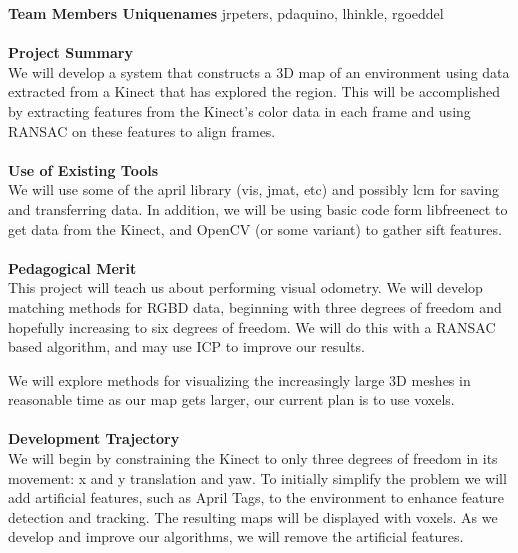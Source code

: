 \documentclass[12pt]{article}
\begin{document}
{\bf Team Members Uniquenames}
jrpeters, pdaquino, lhinkle, rgoeddel
\\ \\
{\bf Project Summary }\\
We will develop a system that constructs a 3D map of an environment using data extracted 
from a Kinect that has explored the region.  This will be accomplished by extracting features 
from the Kinect's color data in each frame and using RANSAC on these features to align 
frames.  
\\ \\
{\bf Use of Existing Tools }\\
We will use some of the april library (vis, jmat, etc) and possibly lcm for saving and 
transferring data.  In addition, we will be using basic code form libfreenect to get data from
 the Kinect, and OpenCV (or some variant) to gather sift features.
\\ \\
{\bf Pedagogical Merit }\\ 
This project will teach us about performing visual odometry.  We will develop matching 
methods for RGBD data, beginning with three degrees of freedom and hopefully increasing
to six degrees of freedom.  We will do this with a RANSAC based algorithm, and may use ICP
to improve our results.  

We will explore methods for visualizing the increasingly large 3D meshes in reasonable time
as our map gets larger, our current plan is to use voxels.
\\ \\
{\bf Development Trajectory }\\ 
We will begin by constraining the Kinect to only three degrees of freedom in its movement: x
and y translation and yaw.  To initially simplify the problem we will add artificial features, such
as April Tags, to the environment to enhance feature detection and tracking.  The resulting 
maps will be displayed with voxels.  As we develop and improve our algorithms, we will remove
the artificial features.
\end{document}
